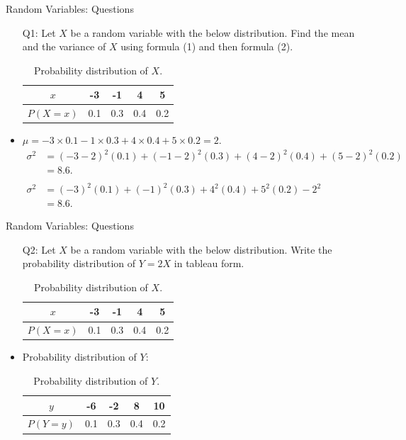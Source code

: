\documentclass[10pt, handout, xcolor=table]{beamer}
\begin{document}
\begin{frame}{Random Variables: Questions}
\begin{itemize} 
\item[Q1:] Let $X$ be a random variable with the below distribution. Find the mean and the variance of $X$ using formula (1) and then formula (2).
\begin{table}
\begin{tabular}{|c|c|c|c|c|}
\hline
\rowcolor{blue!10} $x$ & -3 & -1 & 4&5  \\ \hline
$P(X = x)$ & 0.1 & 0.3 & 0.4 &0.2 \\
\hline
\end{tabular}
\caption{Probability distribution of $X$.} 
\end{table}
\item<2->[A1:]  {\color{red} $\mu = -3\times 0.1 -1\times 0.3 + 4\times 0.4 + 5\times 0.2 =2.$
\begin{align*}
\sigma^2&= (-3-2)^2(0.1) + (-1-2)^2(0.3) + (4-2)^2(0.4) + (5-2)^2(0.2) \\
&= 8.6.\\
  \\
\sigma^2 &= (-3)^2(0.1) + (-1)^2(0.3) + 4^2(0.4) + 5^2(0.2) - 2^2\\
&=8.6.
\end{align*}}
\end{itemize} 

\end{frame}

\begin{frame}{Random Variables: Questions}
\begin{itemize} 
\item[Q2:] Let $X$ be a random variable with the below distribution. Write the probability distribution of $Y = 2X$ in tableau form.
\bigskip
\begin{table}
\begin{tabular}{|c|c|c|c|c|}
\hline
\rowcolor{blue!10} $x$ & -3 & -1 & 4&5  \\ \hline
$P(X = x)$ & 0.1 & 0.3 & 0.4 &0.2 \\
\hline
\end{tabular}
\caption{Probability distribution of $X$.} 
\end{table}
\item<2->[A2:]  {\color{red} Probability distribution of $Y$:}
\bigskip
\begin{table}[H]
\begin{tabular}{|c|c|c|c|c|}
\hline
\rowcolor{blue!10} $y$ & -6 & -2 & 8 & 10  \\ \hline
$P(Y = y)$ & 0.1 & 0.3 & 0.4 &0.2 \\
\hline
\end{tabular}
\caption{Probability distribution of $Y$.} 
\end{table}
\end{itemize} 

\end{frame}
\end{document}
